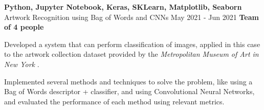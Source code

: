 \cventry
  {\textbf{Python, Jupyter Notebook, Keras, SKLearn, Matplotlib, Seaborn}}
  {Artwork Recognition using Bag of Words and CNNs \href{https://github.com/EduRibeiro00/ArtworkRecognition-feup-vcom/tree/master/proj2}{\faExternalLink}} %
  {May 2021 - Jun 2021}
  {\textbf{Team of 4 people}}
  {
    \begin{cvitems} %
      \item {Developed a system that can perform classification of images, applied in this case to the artwork collection dataset provided by the \textit{Metropolitan Museum of Art in New York} \href{https://www.kaggle.com/metmuseum/the-metropolitan-museum-of-art-open-access}{\faExternalLink}.}
      \item {Implemented several methods and techniques to solve the problem, like using a Bag of Words descriptor + classifier, and using Convolutional Neural Networks, and evaluated the performance of each method using relevant metrics.}
    \end{cvitems}
  }
